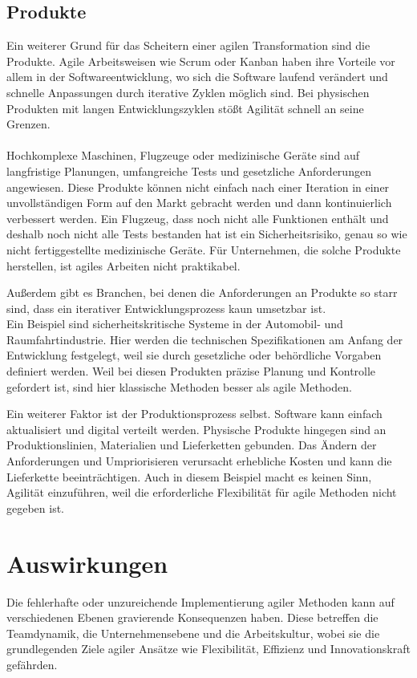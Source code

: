 \documentclass[ngerman]{seminarvorlage}
\begin{document}
\subsection{Produkte}

Ein weiterer Grund für das Scheitern einer agilen Transformation sind die Produkte. Agile Arbeitsweisen wie Scrum oder Kanban haben ihre Vorteile vor allem in der Softwareentwicklung, wo sich die Software laufend verändert und schnelle Anpassungen durch iterative Zyklen möglich sind. Bei physischen Produkten mit langen Entwicklungszyklen stößt Agilität schnell an seine Grenzen\cite{Simons.2021}.\\\\
Hochkomplexe Maschinen, Flugzeuge oder medizinische Geräte sind auf langfristige Planungen, umfangreiche Tests und gesetzliche Anforderungen angewiesen. Diese Produkte können nicht einfach nach einer Iteration in einer unvollständigen Form auf den Markt gebracht werden und dann kontinuierlich verbessert werden. Ein Flugzeug, dass noch nicht alle Funktionen enthält und deshalb noch nicht alle Tests bestanden hat ist ein Sicherheitsrisiko, genau so wie nicht fertiggestellte medizinische Geräte. Für Unternehmen, die solche Produkte herstellen, ist agiles Arbeiten nicht praktikabel.

Außerdem gibt es Branchen, bei denen die Anforderungen an Produkte so starr sind, dass ein iterativer Entwicklungsprozess kaun umsetzbar ist.\\ Ein Beispiel sind sicherheitskritische Systeme in der Automobil- und Raumfahrtindustrie. Hier werden die technischen Spezifikationen am Anfang der Entwicklung festgelegt, weil sie durch gesetzliche oder behördliche Vorgaben definiert werden. Weil bei diesen Produkten präzise Planung und Kontrolle gefordert ist, sind hier klassische Methoden besser als agile Methoden.

Ein weiterer Faktor ist der Produktionsprozess selbst. Software kann einfach aktualisiert und digital verteilt werden. Physische Produkte hingegen sind an Produktionslinien, Materialien und Lieferketten gebunden. Das Ändern der Anforderungen und Umpriorisieren verursacht erhebliche Kosten und kann die Lieferkette beeinträchtigen. Auch in diesem Beispiel macht es keinen Sinn, Agilität einzuführen, weil die erforderliche Flexibilität für agile Methoden nicht gegeben ist.


\section{Auswirkungen}
Die fehlerhafte oder unzureichende Implementierung agiler Methoden kann auf verschiedenen Ebenen gravierende Konsequenzen haben. Diese betreffen die Teamdynamik, die Unternehmensebene und die Arbeitskultur, wobei sie die grundlegenden Ziele agiler Ansätze wie Flexibilität, Effizienz und Innovationskraft gefährden.
\end{document}
